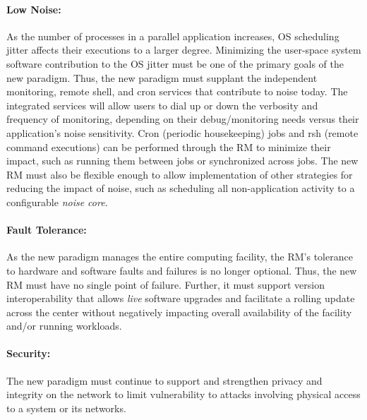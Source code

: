 \documentclass[10pt]{article}
\newcommand{\ngrm}{NGRM}
\begin{document}
\paragraph{Low Noise:}
As the number of processes in a parallel application increases, 
OS scheduling jitter affects their executions to a larger degree.
Minimizing
the user-space system software contribution to the OS jitter must be one 
of the primary goals of the new paradigm.  Thus, the new paradigm must supplant
the independent monitoring, remote shell, and cron
services that contribute to noise today. The integrated services will
allow users to dial up or down the verbosity and frequency of monitoring,
depending on their debug/monitoring needs versus their application's noise
sensitivity. Cron (periodic housekeeping) jobs and rsh (remote command
executions) can be performed through the RM to minimize their impact,
such as running them between jobs or synchronized across jobs. 
The new RM must also be flexible enough to allow implementation of other
strategies for reducing the impact of noise, such as scheduling all
non-application activity to a configurable {\em noise core}.


\paragraph{Fault Tolerance:}
As the new paradigm manages the entire computing facility,
the RM's tolerance to hardware and software faults and failures
is no longer optional.
Thus, the new RM must have no single point of failure. Further, it must support
version interoperability that allows {\em live} software upgrades
and facilitate a rolling update across the center
without negatively impacting overall availability of 
the facility and/or running workloads.


\paragraph{Security:}
The new paradigm must continue to support and strengthen privacy 
and integrity on
the network to limit vulnerability to attacks involving physical access
to a system or its networks.

%
\end{document}
